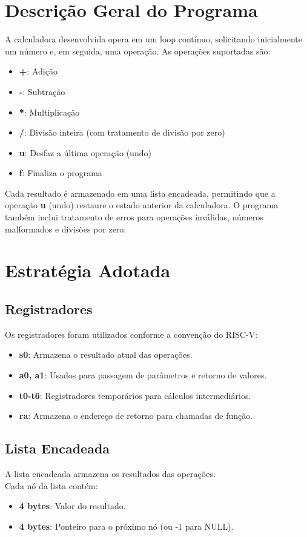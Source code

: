 \documentclass[12pt]{article}
\begin{document}
\section{Descrição Geral do Programa}
A calculadora desenvolvida opera em um loop contínuo, solicitando
inicialmente um número e, em seguida, uma operação. As operações suportadas são:
\begin{itemize}
	\item \textbf{+}: Adição
	\item \textbf{-}: Subtração
	\item \textbf{*}: Multiplicação
	\item \textbf{/}: Divisão inteira (com tratamento de divisão por zero)
	\item \textbf{u}: Desfaz a última operação (undo)
	\item \textbf{f}: Finaliza o programa
\end{itemize}

Cada resultado é armazenado em uma lista encadeada, permitindo que a
operação \textbf{u} (undo) restaure o estado anterior da calculadora.
O programa também inclui tratamento de erros para operações
inválidas, números malformados e divisões por zero.

\section{Estratégia Adotada}
\subsection{Registradores}
Os registradores foram utilizados conforme a convenção do RISC-V:
\begin{itemize}
	\item \textbf{s0}: Armazena o resultado atual das operações.
	\item \textbf{a0, a1}: Usados para passagem de parâmetros e retorno de valores.
	\item \textbf{t0-t6}: Registradores temporários para cálculos intermediários.
	\item \textbf{ra}: Armazena o endereço de retorno para chamadas de função.
\end{itemize}

\subsection{Lista Encadeada}
A lista encadeada armazena os resultados das operações.\\
Cada nó da lista contém:
\begin{itemize}
	\item \textbf{4 bytes}: Valor do resultado.
	\item \textbf{4 bytes}: Ponteiro para o próximo nó (ou -1 para NULL).
\end{itemize}
\end{document}
